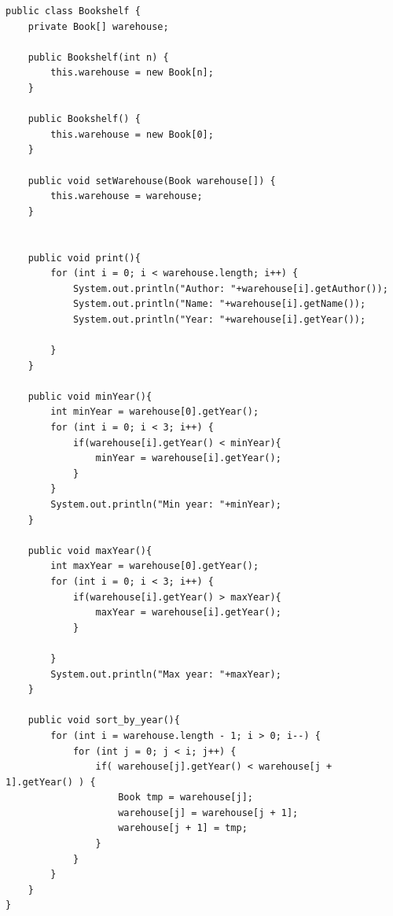 \documentclass[14pt, a4paper]{extarticle}
\newenvironment{code}{\captionsetup{type=listing}}{}
\begin{document}
\begin{code}
\begin{Verbatim}[frame=single, fontsize=\footnotesize]
public class Bookshelf {
    private Book[] warehouse;

    public Bookshelf(int n) {
        this.warehouse = new Book[n];
    }

    public Bookshelf() {
        this.warehouse = new Book[0];
    }

    public void setWarehouse(Book warehouse[]) {
        this.warehouse = warehouse;
    }


    public void print(){
        for (int i = 0; i < warehouse.length; i++) {
            System.out.println("Author: "+warehouse[i].getAuthor());
            System.out.println("Name: "+warehouse[i].getName());
            System.out.println("Year: "+warehouse[i].getYear());

        }
    }

    public void minYear(){
        int minYear = warehouse[0].getYear();
        for (int i = 0; i < 3; i++) {
            if(warehouse[i].getYear() < minYear){
                minYear = warehouse[i].getYear();
            }
        }
        System.out.println("Min year: "+minYear);
    }

    public void maxYear(){
        int maxYear = warehouse[0].getYear();
        for (int i = 0; i < 3; i++) {
            if(warehouse[i].getYear() > maxYear){
                maxYear = warehouse[i].getYear();
            }

        }
        System.out.println("Max year: "+maxYear);
    }

    public void sort_by_year(){
        for (int i = warehouse.length - 1; i > 0; i--) {
            for (int j = 0; j < i; j++) {
                if( warehouse[j].getYear() < warehouse[j + 1].getYear() ) {
                    Book tmp = warehouse[j];
                    warehouse[j] = warehouse[j + 1];
                    warehouse[j + 1] = tmp;
                }
            }
        }
    }
}
\end{Verbatim}
\end{code}
\end{document}
